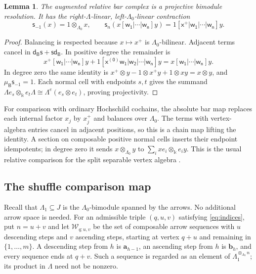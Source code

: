 \documentclass[a4paper,11pt,oneside,reqno]{amsart}
\newtheorem{lemma}[theorem]{Lemma}
\theoremstyle{definition}
\numberwithin{equation}{section}
\begin{document}
\begin{lemma}\label{lem:relative-exact}
The augmented relative bar complex is a projective bimodule resolution.
It has the right-$\Lambda$-linear, left-$\Lambda_0$-linear contraction
\begin{equation}\label{eq:bar-contraction}
 \mathsf s_{-1}(x)=1\otimes_{\Lambda_0}x,\qquad
 \mathsf s_n(x\mathsf{[w_1|\cdots|w_n]}y)
 =1\mathsf{[x^+|w_1|\cdots|w_n]}y.
\end{equation}
\end{lemma}
\begin{proof}
Balancing is respected because $x\mapsto x^+$ is $\Lambda_0$-bilinear.
Adjacent terms cancel in $\mathsf d_{\mathsf B}\mathsf s+
\mathsf s\mathsf d_{\mathsf B}$. In positive degree the remainder is
\[
 x^+\mathsf{[w_1|\cdots|w_n]}y+
 1\mathsf{[x^{(0)}w_1|w_2|\cdots|w_n]}y
 =x\mathsf{[w_1|\cdots|w_n]}y.
\]
In degree zero the same identity is
$x^+\otimes y-1\otimes x^+y+1\otimes xy=x\otimes y$, and
$\mu_{\mathsf B}\mathsf s_{-1}=1$.
Each normal cell with endpoints $s,t$ gives the summand
$\Lambda e_s\otimes_\Bbbk e_t\Lambda\cong
\Lambda^e(e_s\otimes e_t)$, proving projectivity.
\end{proof}
For comparison with ordinary Hochschild cochains, the absolute bar map
replaces each internal factor $x_j$ by $x_j^+$ and balances over
$\Lambda_0$. The terms with vertex-algebra entries cancel in adjacent
positions, so this is a chain map lifting the identity. A section on
composable positive normal cells inserts their endpoint idempotents;
in degree zero it sends $x\otimes_{\Lambda_0}y$ to
$\sum_i xe_i\otimes_\Bbbk e_i y$. This is the usual relative comparison
for the split separable vertex algebra \cite{Cibils,CLMS}.

\subsection{The shuffle comparison map}

Recall that $\Lambda_1\subseteq J$ is the $\Lambda_0$-bimodule
spanned by the arrows. No additional arrow space is needed. For an
admissible triple $(q,u,v)$ satisfying \eqref{eq:indices}, put
$n=u+v$ and let $\mathcal W_{q;u,v}$ be the set of composable arrow
sequences with $u$ descending steps and $v$ ascending steps, starting
at vertex $q+u$ and remaining in $\{1,\ldots,m\}$. A descending step
from $h$ is $\mathbf a_{h-1}$, an ascending step from $h$ is
$\mathbf b_h$, and every sequence ends at $q+v$. Such a sequence is
regarded as an element of $\Lambda_1^{\otimes_{\Lambda_0}n}$;
its product in $\Lambda$ need not be nonzero.
\end{document}
